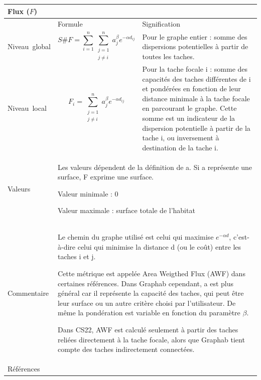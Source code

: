\documentclass{article}
\begin{document}
\begin{table}[H]
\begin{tabular}{|m{3.24cm}|m{4.4810004cm}m{7.924cm}|}

\hline
\multicolumn{3}{|m{16.044998cm}|}{Flux ($F$)}\\\hline
 &
\multicolumn{1}{m{4.4810004cm}|}{Formule} &
Signification\\\hline
Niveau~global &
\multicolumn{1}{m{4.4810004cm}|}{\begin{equation*}
S\#F=\sum _{i=1}^{n}{\sum _{\begin{matrix}j=1\\j{\neq}i\end{matrix}}^{n}{{a}_{j}^{\beta }}}{e}^{-\alpha {d}_{\mathit{ij}}}
\end{equation*}
} &
Pour le graphe entier : somme des dispersions potentielles à partir de toutes les taches.\\\hline
Niveau~local &
\multicolumn{1}{m{4.4810004cm}|}{\begin{equation*}
{F}_{i}=\sum _{\begin{matrix}j=1\\j{\neq}i\end{matrix}}^{n}{{a}_{j}^{\beta }}{e}^{-\alpha {d}_{\mathit{ij}}}
\end{equation*}
} &
Pour la tache focale i : somme des capacités des taches différentes de i et pondérées en fonction de leur distance minimale à la tache focale en parcourant le graphe. Cette somme est un indicateur de la dispersion potentielle à partir de la tache i, ou inversement à destination de la tache i.

\\\hline
Valeurs &
\multicolumn{2}{m{12.6050005cm}|}{Les valeurs dépendent de la définition de a. Si a représente une surface, F exprime une surface.

Valeur minimale : 0

Valeur maximale : surface totale de l’habitat
}\\\hline
Commentaire &
\multicolumn{2}{m{12.6050005cm}|}{Le chemin du graphe utilisé est celui qui maximise  ${e}^{-\mathit{\alpha d}}$, c’est-à-dire celui qui minimise la distance d (ou le coût) entre les taches i et j.

Cette métrique est appelée Area Weigthed Flux (AWF) dans certaines références. Dans Graphab cependant, a est plus général car il représente la capacité des taches, qui peut être leur surface ou un autre critère choisi par l’utilisateur. De même la pondération est variable en fonction du paramètre $\beta $.

Dans CS22, AWF est calculé seulement à partir des taches reliées directement à la tache focale, alors que Graphab tient compte des taches indirectement connectées. 

}\\\hline
Références &
\multicolumn{2}{m{12.6050005cm}|}{
	\cite{Urban2001} \cite{Saura2009} \cite{2012_SDM}
}\\\hline
\end{tabular}
\end{table}
\end{document}

